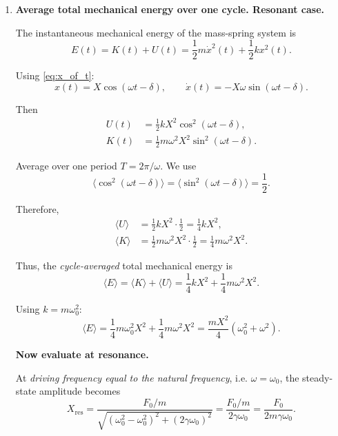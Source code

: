 \documentclass[../main.tex]{subfiles}
\begin{document}
\begin{enumerate}

\item \textbf{Average total mechanical energy over one cycle. Resonant case.}

The instantaneous mechanical energy of the mass-spring system is
\begin{equation}
E(t) = K(t) + U(t)
= \frac{1}{2} m \dot{x}^2(t) + \frac{1}{2} k x^2(t).
\label{eq:Et}
\end{equation}

Using \eqref{eq:x_of_t}:
\[
x(t) = X \cos(\omega t - \delta),
\qquad
\dot{x}(t) = -X \omega \sin(\omega t - \delta).
\]

Then
\begin{align}
U(t) &= \frac{1}{2} k X^2 \cos^2(\omega t - \delta), \\
K(t) &= \frac{1}{2} m \omega^2 X^2 \sin^2(\omega t - \delta).
\end{align}

Average over one period $T = 2\pi/\omega$.
We use
\[
\langle \cos^2(\omega t - \delta) \rangle = \langle \sin^2(\omega t - \delta) \rangle = \frac{1}{2}.
\]

Therefore,
\begin{align}
\langle U \rangle 
&= \frac{1}{2} k X^2 \cdot \frac{1}{2}
= \frac{1}{4} k X^2, \\
\langle K \rangle
&= \frac{1}{2} m \omega^2 X^2 \cdot \frac{1}{2}
= \frac{1}{4} m \omega^2 X^2.
\end{align}

Thus, the \emph{cycle-averaged} total mechanical energy is
\begin{equation}
\langle E \rangle
= \langle K \rangle + \langle U \rangle
= \frac{1}{4} k X^2 + \frac{1}{4} m \omega^2 X^2.
\label{eq:avgE_general}
\end{equation}

Using $k = m \omega_0^2$:
\begin{equation}
\langle E \rangle
= \frac{1}{4} m \omega_0^2 X^2 + \frac{1}{4} m \omega^2 X^2
= \frac{m X^2}{4} (\omega_0^2 + \omega^2).
\label{eq:avgE_simplified}
\end{equation}

\textbf{Now evaluate at resonance.}

At \emph{driving frequency equal to the natural frequency}, i.e. $\omega = \omega_0$, the steady-state amplitude becomes
\[
X_\text{res}
= \frac{F_0/m}{\sqrt{(\omega_0^2 - \omega_0^2)^2 + (2\gamma \omega_0)^2}}
= \frac{F_0/m}{2\gamma \omega_0}
= \frac{F_0}{2 m \gamma \omega_0}.
\]


\end{enumerate}
\end{document}
